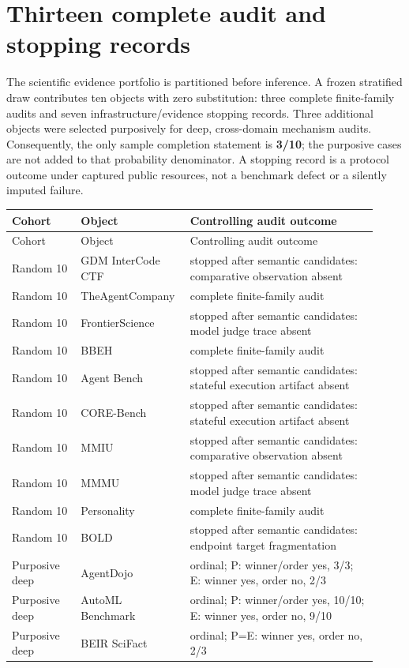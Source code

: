 \clearpage
\begingroup
\setlength{\emergencystretch}{3em}
\section{Thirteen complete audit and stopping records}\label{app:r8-census}
The scientific evidence portfolio is partitioned before inference.  A frozen stratified draw contributes ten objects with zero substitution: three complete finite-family audits and seven infrastructure/evidence stopping records.  Three additional objects were selected purposively for deep, cross-domain mechanism audits.  Consequently, the only sample completion statement is \textbf{3/10}; the purposive cases are not added to that probability denominator.  A stopping record is a protocol outcome under captured public resources, not a benchmark defect or a silently imputed failure.
\begingroup\scriptsize
\begin{longtable}{@{}p{0.18\linewidth}p{0.25\linewidth}p{0.49\linewidth}@{}}
\toprule Cohort & Object & Controlling audit outcome \\
\midrule\endfirsthead
\toprule Cohort & Object & Controlling audit outcome \\
\midrule\endhead
Random 10 & GDM InterCode CTF & stopped after semantic candidates: comparative observation absent \\
Random 10 & TheAgentCompany & complete finite-family audit \\
Random 10 & FrontierScience & stopped after semantic candidates: model judge trace absent \\
Random 10 & BBEH & complete finite-family audit \\
Random 10 & Agent Bench & stopped after semantic candidates: stateful execution artifact absent \\
Random 10 & CORE-Bench & stopped after semantic candidates: stateful execution artifact absent \\
Random 10 & MMIU & stopped after semantic candidates: comparative observation absent \\
Random 10 & MMMU & stopped after semantic candidates: model judge trace absent \\
Random 10 & Personality & complete finite-family audit \\
Random 10 & BOLD & stopped after semantic candidates: endpoint target fragmentation \\
Purposive deep & AgentDojo & ordinal; P: winner/order yes, 3/3; E: winner yes, order no, 2/3 \\
Purposive deep & AutoML Benchmark & ordinal; P: winner/order yes, 10/10; E: winner yes, order no, 9/10 \\
Purposive deep & BEIR SciFact & ordinal; P=E: winner yes, order no, 2/3 \\
\bottomrule\end{longtable}\endgroup
